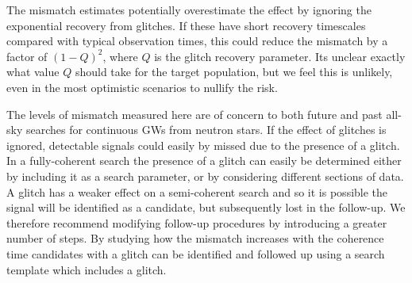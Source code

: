 \documentclass[../full_thesis/full_thesis.tex]{subfiles}
\begin{document}
The mismatch estimates potentially overestimate the effect by ignoring
the exponential recovery from glitches. If these have short recovery timescales
compared with typical observation times, this could reduce the mismatch by a
factor of $(1-Q)^{2}$, where $Q$ is the glitch recovery parameter. Its unclear
exactly what value $Q$ should take for the target population, but we feel this
is unlikely, even in the most optimistic scenarios to nullify the risk.

The levels of mismatch measured here are of concern to both future and past
all-sky searches for continuous GWs from neutron stars. If the effect of
glitches is ignored, detectable signals could easily by missed due to the
presence of a glitch. In a fully-coherent search the presence of a glitch can
easily be determined either by including it as a search parameter, or by
considering different sections of data. A glitch has a weaker effect on a
semi-coherent search and so it is possible the signal will be identified as a
candidate, but subsequently lost in the follow-up.  We therefore recommend
modifying follow-up procedures by introducing a greater number of steps. By
studying how the mismatch increases with the coherence time candidates with a
glitch can be identified and followed up using a search template which includes
a glitch.

\end{document}
